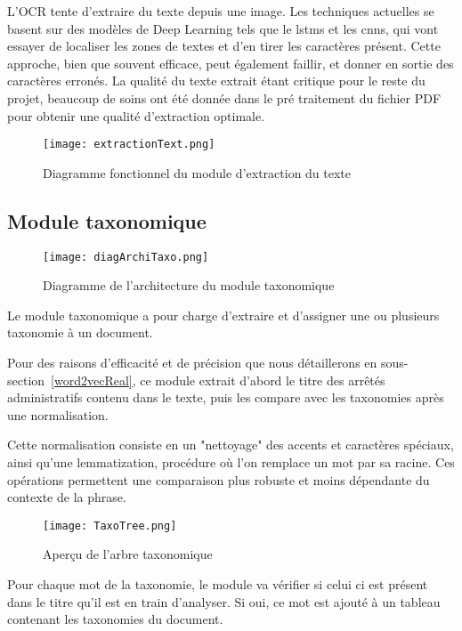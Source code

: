 L'OCR tente d'extraire du texte depuis une image.
Les techniques actuelles se basent sur des modèles de Deep Learning tels que le \glspl{lstm} et les \glspl{cnn}, qui vont essayer de localiser les zones de textes et d'en tirer les caractères présent.
Cette approche, bien que souvent efficace, peut également faillir, et donner en sortie des caractères erronés.
La qualité du texte extrait étant critique pour le reste du projet, beaucoup de soins ont été donnée dans le pré traitement du fichier PDF pour obtenir une qualité d'extraction optimale.

\begin{figure}[h!]
  \centering
	\texttt{[image: extractionText.png]}
	\caption[]{Diagramme fonctionnel du module d'extraction du texte}
  \label{}
\end{figure}


\subsection{Module taxonomique}

\begin{figure}[h!]
  \centering
  \texttt{[image: diagArchiTaxo.png]}
	\caption[]{Diagramme de l'architecture du module taxonomique}
  \label{}
\end{figure}


Le module taxonomique a pour charge d'extraire et d'assigner une ou plusieurs taxonomie à un document.

Pour des raisons d'efficacité et de précision que nous détaillerons en sous-section~\ref{word2vecReal}, ce module extrait d'abord le titre des arrêtés administratifs contenu dans le texte, puis les compare avec les taxonomies après une normalisation.

Cette normalisation consiste en un "nettoyage" des accents et caractères spéciaux, ainsi qu'une lemmatization, procédure où l'on remplace un mot par sa racine.
Ces opérations permettent une comparaison plus robuste et moins dépendante du contexte de la phrase. 

\begin{figure}[h!]
  \centering
  \texttt{[image: TaxoTree.png]}
	\caption[]{Aperçu de l'arbre taxonomique}
  \label{fig:tree}
\end{figure}

Pour chaque mot de la taxonomie, le module va vérifier si celui ci est présent dans le titre qu'il est en train d'analyser.
Si oui, ce mot est ajouté à un tableau contenant les taxonomies du document.

